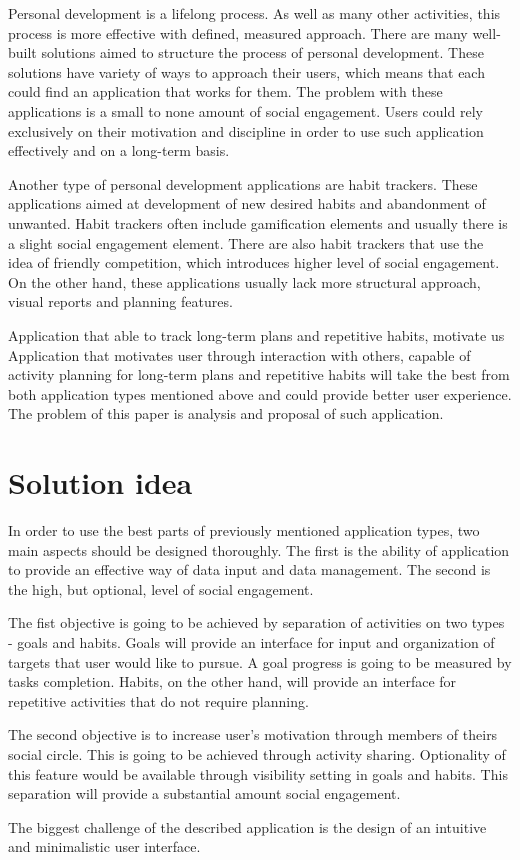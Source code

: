 Personal development is a lifelong process.
As well as many other activities, this process is more effective with defined, measured approach.
There are many well-built solutions aimed to structure the process of personal development.
These solutions have variety of ways to approach their users, which means that each could find an application that works for them.
The problem with these applications is a small to none amount of social engagement.
Users could rely exclusively on their motivation and discipline in order to use such application effectively and on a long-term basis.

Another type of personal development applications are habit trackers.
These applications aimed at development of new desired habits and abandonment of unwanted.
Habit trackers often include gamification elements and usually there is a slight social engagement element.
There are also habit trackers that use the idea of friendly competition, which introduces higher level of social engagement.
On the other hand, these applications usually lack more structural approach, visual reports and planning features.

Application that able to track long-term plans and repetitive habits, motivate us
Application that motivates user through interaction with others, capable of activity planning for long-term plans and repetitive habits
will take the best from both application types mentioned above and could provide better user experience.
The problem of this paper is analysis and proposal of such application.


\section{Solution idea}\label{sec:solution-idea}

In order to use the best parts of previously mentioned application types, two main aspects should be designed thoroughly.
The first is the ability of application to provide an effective way of data input and data management.
The second is the high, but optional, level of social engagement.

The fist objective is going to be achieved by separation of activities on two types - goals and habits.
Goals will provide an interface for input and organization of targets that user would like to pursue.
A goal progress is going to be measured by tasks completion.
Habits, on the other hand, will provide an interface for repetitive activities that do not require planning.

The second objective is to increase user's motivation through members of theirs social circle.
This is going to be achieved through activity sharing.
Optionality of this feature would be available through visibility setting in goals and habits.
This separation will provide a substantial amount social engagement.

The biggest challenge of the described application is the design of an intuitive and minimalistic user interface.
